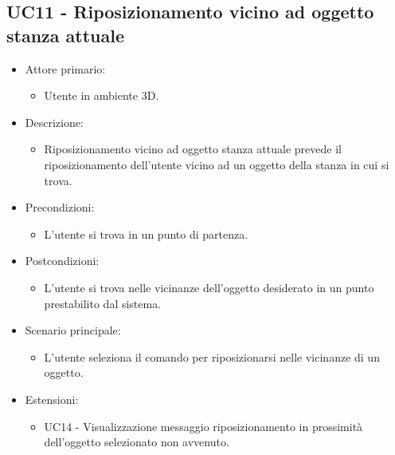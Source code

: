 \subsection{UC11 - Riposizionamento vicino ad oggetto stanza attuale}
\begin{itemize}

	\item Attore primario: 
	\begin{itemize}
		\item Utente in ambiente 3D.
	\end{itemize}
	\item Descrizione:
	\begin{itemize}
		\item Riposizionamento vicino ad oggetto stanza attuale prevede il riposizionamento dell'utente vicino ad un oggetto
della stanza in cui si trova.
	\end{itemize}
	
	\item Precondizioni:
	\begin{itemize}
		\item L'utente si trova in un punto di partenza.
	\end{itemize}
	
	\item Postcondizioni:
	\begin{itemize}
		\item L'utente si trova nelle vicinanze dell'oggetto desiderato in un punto prestabilito dal sistema.
	\end{itemize}
	
	\item Scenario principale:
	\begin{itemize}
		\item L'utente seleziona il comando per riposizionarsi nelle vicinanze di un oggetto.
	\end{itemize}

	\item Estensioni:
	\begin{itemize}
		\item UC14 - Visualizzazione messaggio riposizionamento in prossimità dell'oggetto selezionato non avvenuto.
	\end{itemize}
	
\end{itemize}

\pagebreak

